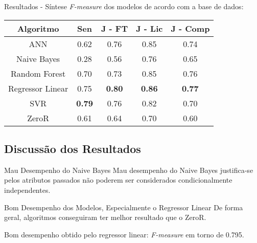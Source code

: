 \begin{frame}{Resultados - Síntese}
    \textit{F-measure} dos modelos de acordo com a base de dados: 
    \begin{table}
    \begin{center}
    \begin{tabular}[c]{| c | c | c | c | c |}
        \hline
        \textbf{Algoritmo} & \textbf{Sen} & \textbf{J - FT} & 
        \textbf{J - Lic} & \textbf{J - Comp} \\
        \hline
        ANN              & 0.62 & 0.76 & 0.85 & 0.74 \\
        \hline
        Naive Bayes      & 0.28 & 0.56 & 0.76 & 0.65 \\
        \hline
        Random Forest    & 0.70 & 0.73 & 0.85 & 0.76 \\
        \hline
        Regressor Linear & 0.75 & \textbf{0.80} & \textbf{0.86} & \textbf{0.77} \\
        \hline
        SVR              & \textbf{0.79} & 0.76 & 0.82 & 0.70 \\
        \hline
        ZeroR            & 0.61 & 0.64 & 0.70 & 0.60 \\
        \hline
    \end{tabular}
    \end{center}
    \end{table}
\end{frame}

\subsection{Discussão dos Resultados}
\begin{frame}{Mau Desempenho do Naive Bayes}
    Mau desempenho do Naive Bayes justifica-se pelos atributos passados
    não poderem ser considerados condicionalmente independentes. 
\end{frame}

\begin{frame}{Bom Desempenho dos Modelos, Especialmente o Regressor Linear}
    De forma geral, algoritmos conseguiram ter melhor resultado que o ZeroR.  

    \vspace{0.5cm}

    Bom desempenho obtido pelo regressor linear: \textit{F-measure} em torno de 0.795. 
\end{frame}
